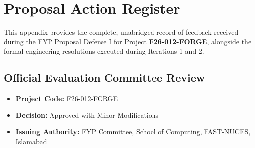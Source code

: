 \chapter{Proposal Action Register}
\label{app:action_reg}

This appendix provides the complete, unabridged record of feedback received during the FYP Proposal Defense I for Project \textbf{F26-012-FORGE}, alongside the formal engineering resolutions executed during Iterations 1 and 2.

\section*{Official Evaluation Committee Review}
\begin{itemize}
    \item \textbf{Project Code:} F26-012-FORGE
    \item \textbf{Decision:} Approved with Minor Modifications
    \item \textbf{Issuing Authority:} FYP Committee, School of Computing, FAST-NUCES, Islamabad
\end{itemize}

